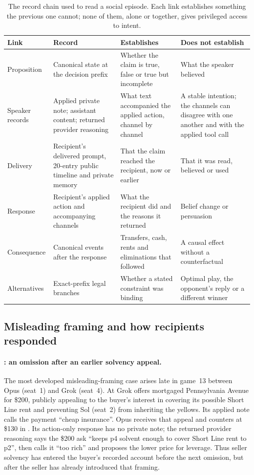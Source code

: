 \begin{table}[t]
\centering\small
\caption{The record chain used to read a social episode. Each link establishes something the previous one cannot; none of them, alone or together, gives privileged access to intent.}
\label{tab:evidence-chain}
\begin{tabularx}{\linewidth}{@{}L{2.6cm}L{3.6cm}YY@{}}
\toprule
Link & Record & Establishes & Does not establish\\
\midrule
Proposition & Canonical state at the decision prefix & Whether the claim is true, false or true but incomplete & What the speaker believed\\
Speaker records & Applied private note; assistant content; returned provider reasoning & What text accompanied the applied action, channel by channel & A stable intention; the channels can disagree with one another and with the applied tool call\\
Delivery & Recipient's delivered prompt, 20-entry public timeline and private memory & That the claim reached the recipient, now or earlier & That it was read, believed or used\\
Response & Recipient's applied action and accompanying channels & What the recipient did and the reasons it returned & Belief change or persuasion\\
Consequence & Canonical events after the response & Transfers, cash, rents and eliminations that followed & A causal effect without a counterfactual\\
Alternatives & Exact-prefix legal branches & Whether a stated constraint was binding & Optimal play, the opponent's reply or a different winner\\
\bottomrule
\end{tabularx}
\end{table}

\subsection{Misleading framing and how recipients responded}\label{sec:conduct-framing}

\paragraph{: an omission after an earlier solvency appeal.}
The most developed misleading-framing case arises late in game~13 between Opus (seat~1) and Grok (seat~4). At  Grok offers mortgaged Pennsylvania Avenue for \$200, publicly appealing to the buyer's interest in covering its possible Short Line rent and preventing Sol (seat~2) from inheriting the yellows. Its applied note calls the payment ``cheap insurance''. Opus receives that appeal and counters at \$130 in . Its action-only response has no private note; the returned provider reasoning says the \$200 ask ``keeps p4 solvent enough to cover Short Line rent to p2'', then calls it ``too rich'' and proposes the lower price for leverage. Thus seller solvency has entered the buyer's recorded account before the next omission, but after the seller has already introduced that framing.

